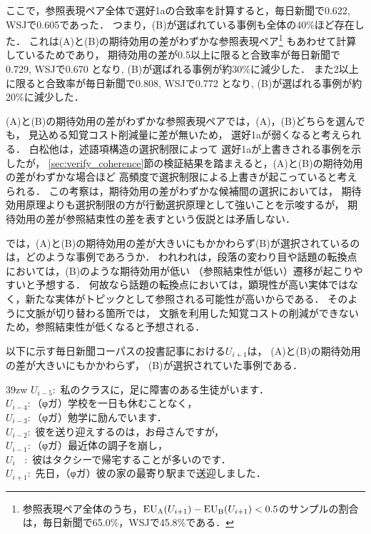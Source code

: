 \documentclass[japanese]{jnlp_1.3e}
\begin{document}
ここで，参照表現ペア全体で選好1aの合致率を計算すると，毎日新聞で0.622, WSJで0.605であった．
つまり，(B)が選ばれている事例も全体の40\%ほど存在した．
これは(A)と(B)の期待効用の差がわずかな参照表現ペア\footnote{
	参照表現ペア全体のうち，${\rm EU_A}(U_{i+1})-{\rm EU_B}(U_{i+1})< 0.5$のサンプルの割合は，毎日新聞で65.0\%，WSJで45.8\%である．}
もあわせて計算しているためであり，
期待効用の差が0.5以上に限ると合致率が毎日新聞で0.729, WSJで0.670 となり, (B)が選ばれる事例が約30\%に減少した．
また2以上に限ると合致率が毎日新聞で0.808, WSJで0.772 となり, (B)が選ばれる事例が約20\%に減少した．

(A)と(B)の期待効用の差がわずかな参照表現ペアでは，(A)，(B)どちらを選んでも，
見込める知覚コスト削減量に差が無いため，
選好1aが弱くなると考えられる．
白松他\citeyear{siramatu2005nlp}は，述語項構造の選択制限によって
選好1aが上書きされる事例を示したが，
\ref{sec:verify_coherence}節の検証結果を踏まえると，(A)と(B)の期待効用の差がわずかな場合ほど
高頻度で選択制限による上書きが起こっていると考えられる．
この考察は，期待効用の差がわずかな候補間の選択においては，
期待効用原理よりも選択制限の方が行動選択原理として強いことを示唆するが，
期待効用の差が参照結束性の差を表すという仮説とは矛盾しない．

では，(A)と(B)の期待効用の差が大きいにもかかわらず(B)が選択されているのは，どのような事例であろうか．
われわれは，段落の変わり目や話題の転換点においては，(B)のような期待効用が低い
（参照結束性が低い）遷移が起こりやすいと予想する．
何故なら話題の転換点においては，顕現性が高い実体ではなく，新たな実体がトピックとして参照される可能性が高いからである．
そのように文脈が切り替わる箇所では，
文脈を利用した知覚コストの削減ができないため，参照結束性が低くなると予想される．


以下に示す毎日新聞コーパスの投書記事における$U_{i+1}$は，
(A)と(B)の期待効用の差が大きいにもかかわらず，
(B)が選択されていた事例である．

    \vspace{\baselineskip}\begin{fminipage}{39zw}
\noindent
$U_{i-5}:$ 私のクラスに，足に障害のある生徒がいます．\\
$U_{i-4}:$（φガ）学校を一日も休むことなく，\\
$U_{i-3}:$（φガ）勉学に励んでいます．\\
$U_{i-2}:$ 彼を送り迎えするのは，お母さんですが，\\
$U_{i-1}:$（φガ）最近体の調子を崩し，\\
$U_{i\phantom{-0}}:$ 彼はタクシーで帰宅することが多いのです．\\
$U_{i+1}:$ 先日，（φガ）彼の家の最寄り駅まで送迎しました．
    \end{fminipage}\vspace{\baselineskip}
\end{document}
